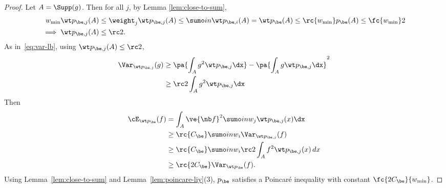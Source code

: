 \begin{proof}
Let $A=\Supp(g)$. Then for all $j$, by Lemma \ref{lem:close-to-sum},
\begin{align}
w_{\min}\wt p_{\be,j}(A) &\le \weight_j \wt p_{\be, j}(A)\le 
\sumo in \wt p_{\be,i}(A) = \wt p_\be(A) 
\le \rc{w_{\min}} p_\be(A)
\le \fc{w_{\min}}2\\
\implies
\wt p_{\be,j}(A) & \le \rc 2.
\end{align}
As in~\eqref{eq:var-lb}, using $\wt p_{\be,j}(A)\le \rc 2$, 
\begin{align}
\Var_{\wt p_{\be, j}}(g) &\ge 
\pa{\int_A g^2\wt p_{\be, j}\dx} - \pa{\int_A g\wt p_{\be, j}\dx}^2\\
&\ge \rc 2 \int_A g^2 \wt p_{\be,j}\dx
\end{align}
Then
\begin{align}
\cE_{\wt p_\be}(f) 
&= \int_{A} \ve{\nb f}^2 \sumo in w_j \wt p_{\be,j}(x)\dx\\
&\ge \rc{C_\be} \sumo in w_i \Var_{\wt p_{\be,j}}(f)\\
&\ge\rc{C_\be}\sumo in w_i \rc 2 \int_A f^2 \wt p_{\be,j}(x) \,dx\\
&\ge \rc{2C_\be} \Var_{\wt p_\be}(f).
\end{align}
Using Lemma~\ref{lem:close-to-sum} and
 Lemma~\ref{lem:poincare-liy}(3), $p_\be$ satisfies a Poincar\'e inequality with constant $\fc{2C_\be}{w_{\min}}$.
\end{proof}

